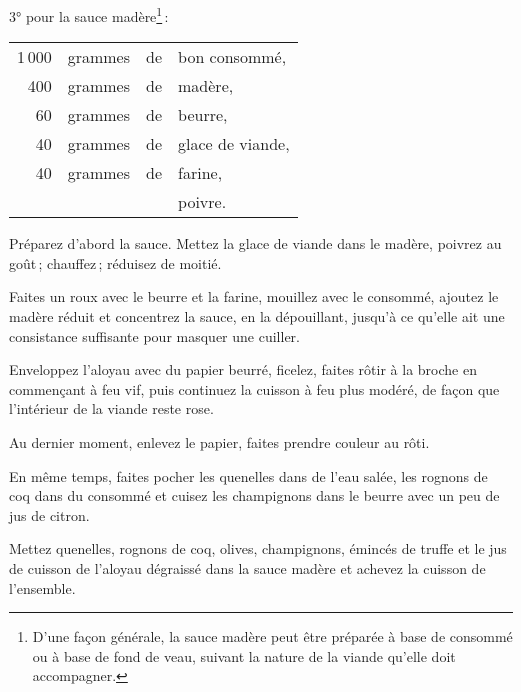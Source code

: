 3° pour la sauce madère\footnote{D'une façon générale, la sauce madère peut
être préparée à base de consommé ou à base de fond de veau, suivant la nature
de la viande qu'elle doit accompagner.} :

\medskip

\footnotesize
\begin{longtable}{rrrp{16em}}
  1 000 & grammes & de & bon consommé,                                                                    \\
    400 & grammes & de & madère,                                                                          \\
     60 & grammes & de & beurre,                                                                          \\
     40 & grammes & de & glace de viande,                                                                 \\
     40 & grammes & de & farine,                                                                          \\
        &         &    & poivre.                                                                          \\
\end{longtable}
\normalsize

\label{pg0459} \hypertarget{p0459}{}
Préparez d'abord la sauce. Mettez la glace de viande dans le madère, poivrez au
goût ; chauffez ; réduisez de moitié.

Faites un roux avec le beurre et la farine, mouillez avec le consommé, ajoutez
le madère réduit et concentrez la sauce, en la dépouillant, jusqu'à ce qu'elle ait
une consistance suffisante pour masquer une cuiller.

Enveloppez l'aloyau avec du papier beurré, ficelez, faites rôtir à la broche en
commençant à feu vif, puis continuez la cuisson à feu plus modéré, de façon que
l'intérieur de la viande reste rose.

Au dernier moment, enlevez le papier, faites prendre couleur au rôti.

En même temps, faites pocher les quenelles dans de l’eau salée, les rognons de
coq dans du consommé et cuisez les champignons dans le beurre avec un peu de
jus de citron.

Mettez quenelles, rognons de coq, olives, champignons, émincés de truffe et le
jus de cuisson de l'aloyau dégraissé dans la sauce madère et achevez la cuisson
de l'ensemble.

